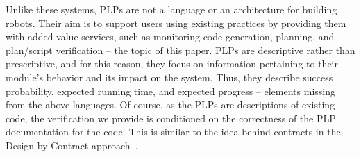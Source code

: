 \documentclass[letterpaper]{article}
\begin{document}
{%
%
%
%
Unlike these systems, PLPs are not a language or an architecture for building robots. 
Their aim is to support users using existing practices
by providing them with added value services, such as monitoring code generation, planning, and plan/script verification -- the topic
of this paper. PLPs are descriptive rather than prescriptive, and for this reason, they focus on information pertaining to their module's behavior and its impact
on the system. Thus, they describe success probability, expected running time, and expected progress -- elements missing from the above languages. Of course, as the PLPs are descriptions of existing code,
the verification we provide is conditioned on the correctness of the PLP documentation for the code. 
This is similar to the idea behind contracts in the Design by Contract approach~\citep{Eiffel}.

}
\end{document}

